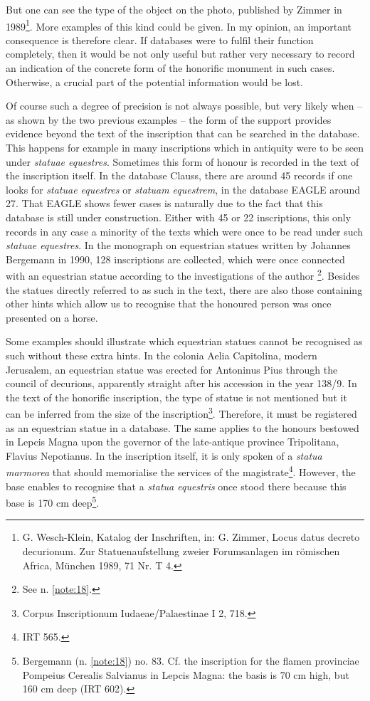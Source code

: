 \documentclass[amsthm,ebook]{saparticle}
\begin{document}
But one can see the type of the object on the photo, published by Zimmer in 1989\footnote{G. Wesch-Klein, Katalog der Inschriften, in: G. Zimmer, Locus datus decreto decurionum. Zur Statuenaufstellung zweier Forumsanlagen im römischen Africa, München 1989, 71 Nr. T 4.}. 
More examples of this kind could be given. In my opinion, an important consequence 
is therefore clear. If databases were to fulfil their function completely, then 
it would be not only useful but rather very necessary to record an indication of 
the concrete form of the honorific monument in such cases. Otherwise, a crucial 
part of the potential information would be lost.  

Of course such a degree of precision is not always possible, but very likely when 
– as shown by the two previous examples – the form of the support provides 
evidence beyond the text of the inscription that can be searched in the database. 
This happens for example in many inscriptions which in antiquity were to be seen 
under \textit{statuae equestres}. Sometimes this form of honour is recorded in 
the text of the inscription itself. In the database Clauss, there are around 45 
records if one looks for \textit{statuae equestres }or \textit{statuam equestrem},\textit{ 
}in the database EAGLE around 27. That EAGLE shows fewer cases is naturally due 
to the fact that this database is still under construction. Either with 45 or 22 
inscriptions, this only records in any case a minority of the texts which were 
once to be read under such \textit{statuae equestres}. In the monograph on equestrian 
statues written by Johannes Bergemann in 1990, 128 inscriptions are collected, 
which were once connected with an equestrian statue according to the investigations 
of the author \footnote{See n. \ref{note:18}.}. Besides the statues directly referred to as such in the text, there 
are also those containing other hints which allow us to recognise that the honoured 
person was once presented on a horse. 



Some examples should illustrate which equestrian statues cannot be recognised as 
such without these extra hints. In the colonia Aelia Capitolina, modern Jerusalem, 
an equestrian statue was erected for Antoninus Pius through the council of decurions, 
apparently straight after his accession in the year 138/9. In the text of the honorific 
inscription, the type of statue is not mentioned but it can be inferred from the 
size of the inscription\footnote{Corpus Inscriptionum Iudaeae/Palaestinae I 2, 718.}. Therefore, it must be registered as an equestrian statue 
in a database. The same applies to the honours bestowed in Lepcis Magna upon the 
governor of the late-antique province Tripolitana, Flavius Nepotianus. In the inscription 
itself, it is only spoken of a \textit{statua marmorea} that should memorialise 
the services of the magistrate\footnote{IRT 565.}. However, the base enables to recognise that a \textit{statua 
equestris }once stood there because this base is 170 cm deep\footnote{Bergemann (n. \ref{note:18}) no. 83. Cf. the inscription for the flamen provinciae Pompeius Cerealis Salvianus in Lepcis Magna: the basis is 70 cm high, but 160 cm deep (IRT 602).}. 
\end{document}
